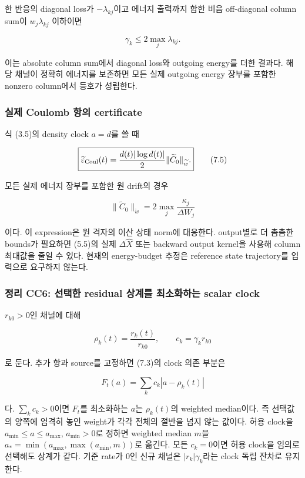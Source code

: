 한 반응의 diagonal loss가 \(-\lambda_{kj}\)이고 에너지 출력까지 합한 비음 off-diagonal column sum이 \(w_j\lambda_{kj}\) 이하이면

\[
\boxed{\gamma_k\le2\max_j\lambda_{kj}.}
\tag{7.4}
\]

이는 absolute column sum에서 diagonal loss와 outgoing energy를 더한 결과다. 해당 채널이 정확히 에너지를 보존하면 모든 실제 outgoing energy 장부를 포함한 nonzero column에서 등호가 성립한다.

\hypertarget{uxc2e4uxc81c-coulomb-uxd56duxc758-certificate}{%
\subsubsection{실제 Coulomb 항의 certificate}\label{uxc2e4uxc81c-coulomb-uxd56duxc758-certificate}}

식 (3.5)의 density clock \(a=d\)를 쓸 때

\[
\boxed{
\widetilde\varepsilon_{\rm Coul}(t)
=\frac{d(t)|\log d(t)|}{2}
\|\widetilde C_0\|_{\widetilde w}.
}
\tag{7.5}
\]

모든 실제 에너지 장부를 포함한 원 drift의 경우

\[
\|\widetilde C_0\|_{\widetilde w}
=2\max_j\frac{\kappa_j}{\Delta W_j}
\tag{7.6}
\]

이다. 이 expression은 원 격자의 이산 상태 norm에 대응한다. output별로 더 촘촘한 bounds가 필요하면 (5.5)의 실제 \(\Delta\widehat X\) 또는 backward output kernel을 사용해 column 최대값을 줄일 수 있다. 현재의 energy-budget 추정은 reference state trajectory를 입력으로 요구하지 않는다.

\hypertarget{uxc815uxb9ac-cc6-uxc120uxd0dduxd55c-residual-uxc0c1uxacc4uxb97c-uxcd5cuxc18cuxd654uxd558uxb294-scalar-clock}{%
\subsubsection{정리 CC6: 선택한 residual 상계를 최소화하는 scalar clock}\label{uxc815uxb9ac-cc6-uxc120uxd0dduxd55c-residual-uxc0c1uxacc4uxb97c-uxcd5cuxc18cuxd654uxd558uxb294-scalar-clock}}

\(r_{k0}>0\)인 채널에 대해

\[
\rho_k(t)=\frac{r_k(t)}{r_{k0}},\qquad
c_k=\gamma_k r_{k0}
\tag{7.7}
\]

로 둔다. 추가 항과 source를 고정하면 (7.3)의 clock 의존 부분은

\[
F_t(a)=\sum_k c_k|a-\rho_k(t)|
\tag{7.8}
\]

다. \(\sum_kc_k>0\)이면 \(F_t\)를 최소화하는 \(a\)는 \(\rho_k(t)\)의 weighted median이다. 즉 선택값의 양쪽에 엄격히 놓인 weight가 각각 전체의 절반을 넘지 않는 값이다. 허용 clock을 \(a_{\min}\le a\le a_{\max}\), \(a_{\min}>0\)로 정하면 weighted median \(m\)을 \(a_*=\min(a_{\max},\max(a_{\min},m))\)로 옮긴다. 모든 \(c_k=0\)이면 허용 clock을 임의로 선택해도 상계가 같다. 기준 rate가 0인 신규 채널은 \(|r_k|\gamma_k\)라는 clock 독립 잔차로 유지한다.

